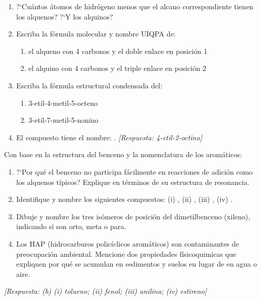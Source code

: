 \begin{bloque_ejercicios}
\begin{ejercicios}
\begin{enumerate}[label=\alph*)]
    \item ?`Cu\'antos \'atomos de hidr\'ogeno menos que el alcano
          correspondiente tienen los alquenos? ?`Y los alquinos?
    \item Escriba la f\'ormula molecular y nombre UIQPA de:
          \begin{enumerate}[label=\roman*)]
              \item el alqueno con 4 carbonos y el doble enlace
                    en posici\'on 1
              \item el alquino con 4 carbonos y el triple enlace
                    en posici\'on 2
          \end{enumerate}
    \item Escriba la f\'ormula estructural condensada del:
          \begin{enumerate}[label=\roman*)]
              \item 3-etil-4-metil-5-octeno
              \item 3-etil-7-metil-5-nonino
          \end{enumerate}
    \item El compuesto 
          tiene el nombre: \underline{\hspace{5cm}}.
          \textit{[Respuesta: 4-etil-2-octino]}
\end{enumerate}

\item Con base en la estructura del benceno y la nomenclatura
de los arom\'aticos:

\begin{enumerate}[label=\alph*)]
    \item ?`Por qu\'e el benceno no participa f\'acilmente en
          reacciones de adici\'on como los alquenos t\'ipicos?
          Explique en t\'erminos de su estructura de resonancia.
    \item Identifique y nombre los siguientes compuestos:
          (i) ,
          (ii) ,
          (iii) ,
          (iv) .
    \item Dibuje y nombre los tres is\'omeros de posici\'on del
          dimetilbenceno (xileno), indicando si son orto, meta
          o para.
    \item Los HAP (hidrocarburos polic\'iclicos arom\'aticos) son
          contaminantes de preocupaci\'on ambiental. Mencione dos
          propiedades f\'isicoquimicas que expliquen por qu\'e se
          acumulan en sedimentos y suelos en lugar de en agua o aire.
\end{enumerate}

\textit{[Respuesta: (b) (i) tolueno; (ii) fenol; (iii) anilina;
(iv) estireno]}

\end{ejercicios}

\end{bloque_ejercicios}
